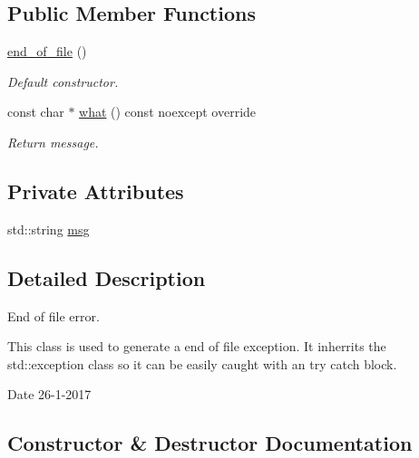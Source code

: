 \subsection*{Public Member Functions}
\begin{DoxyCompactItemize}
\item 
\hyperlink{classend__of__file_a4e87a15d753f94fad00deee27aa4dc02}{end\+\_\+of\+\_\+file} ()
\begin{DoxyCompactList}\small\item\em Default constructor. \end{DoxyCompactList}\item 
const char $\ast$ \hyperlink{classend__of__file_a32e8c4c2f39a8484c2f39f9a98d5dfb8}{what} () const noexcept override
\begin{DoxyCompactList}\small\item\em Return message. \end{DoxyCompactList}\end{DoxyCompactItemize}
\subsection*{Private Attributes}
\begin{DoxyCompactItemize}
\item 
std\+::string \hyperlink{classend__of__file_a965eafe9e5b72fbea7621c4b16e03d99}{msg}
\end{DoxyCompactItemize}


\subsection{Detailed Description}
End of file error. 

This class is used to generate a end of file exception. It inherrits the std\+::exception class so it can be easily caught with an try catch block.

\begin{DoxyDate}{Date}
26-\/1-\/2017 
\end{DoxyDate}


\subsection{Constructor \& Destructor Documentation}
\mbox{\label{classend__of__file_a4e87a15d753f94fad00deee27aa4dc02}} 
